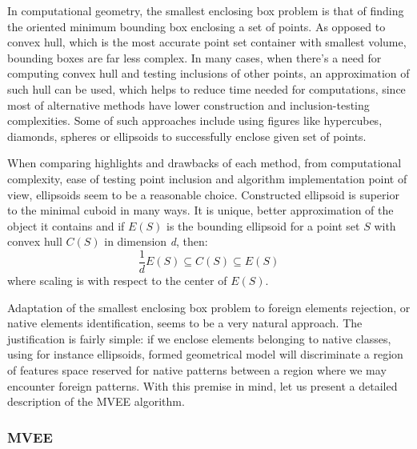 \documentclass{llncs}
\begin{document}
In computational geometry, the smallest enclosing box problem is that of finding the oriented minimum bounding box enclosing a set of points. As opposed to convex hull, which is the most accurate point set container with smallest volume, bounding boxes are far less complex. In many cases, when there's a need for computing convex hull and testing inclusions of other points, an approximation of such hull can be used, which helps to reduce time needed for computations, since most of alternative methods have lower construction and inclusion-testing complexities. Some of such approaches include using figures like hypercubes, diamonds, spheres or ellipsoids to successfully enclose given set of points.

When comparing highlights and drawbacks of each method, from computational complexity, ease of testing point inclusion and algorithm implementation point of view, ellipsoids seem to be a reasonable choice. Constructed ellipsoid is superior to the minimal cuboid in many ways. It is unique, better approximation of the object it contains and if $E(S)$ is the bounding ellipsoid for a point set $S$ with convex hull $C(S)$ in dimension \textit{d}, then:
\[ \frac{1}{d}E(S) \subseteq C(S) \subseteq E(S) \]
where scaling is with respect to the center of $E(S)$.

Adaptation of the smallest enclosing box problem to foreign elements rejection, or native elements identification, seems to be a very natural approach. The justification is fairly simple: if we enclose elements belonging to native classes, using for instance ellipsoids, formed geometrical model will discriminate a region of features space reserved for native patterns between a region where we may encounter foreign patterns. With this premise in mind, let us present a detailed description of the MVEE algorithm.

\subsubsection{MVEE}

\end{document}
